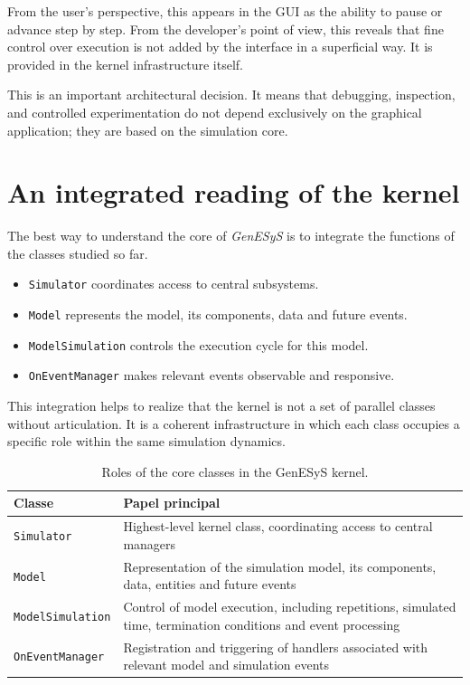 From the user's perspective, this appears in the GUI as the ability to pause or advance step by step. From the developer's point of view, this reveals that fine control over execution is not added by the interface in a superficial way. It is provided in the kernel infrastructure itself.

This is an important architectural decision. It means that debugging, inspection, and controlled experimentation do not depend exclusively on the graphical application; they are based on the simulation core.

\section{An integrated reading of the kernel}
\label{sec:cap7_leitura_integrada_nucleo}

The best way to understand the core of \textit{GenESyS} is to integrate the functions of the classes studied so far.

\begin{itemize}
 \item \texttt{Simulator} coordinates access to central subsystems.
 \item \texttt{Model} represents the model, its components, data and future events.
 \item \texttt{ModelSimulation} controls the execution cycle for this model.
 \item \texttt{OnEventManager} makes relevant events observable and responsive.
\end{itemize}

This integration helps to realize that the kernel is not a set of parallel classes without articulation. It is a coherent infrastructure in which each class occupies a specific role within the same simulation dynamics.

\begin{table}[htbp]
 \centering
 \caption{Roles of the core classes in the GenESyS kernel.}
 \label{tab:cap7_papeis_classes_centrais}
 \small
 \begin{tabular}{|p{3.6cm}|p{7.6cm}|}
 \hline
 \textbf{Classe} & \textbf{Papel principal} \\
 \hline
 \texttt{Simulator} & Highest-level kernel class, coordinating access to central managers \\
 \hline
 \texttt{Model} & Representation of the simulation model, its components, data, entities and future events \\
 \hline
 \texttt{ModelSimulation} & Control of model execution, including repetitions, simulated time, termination conditions and event processing \\
 \hline
 \texttt{OnEventManager} & Registration and triggering of handlers associated with relevant model and simulation events \\
 \hline
 \end{tabular}
\end{table}

